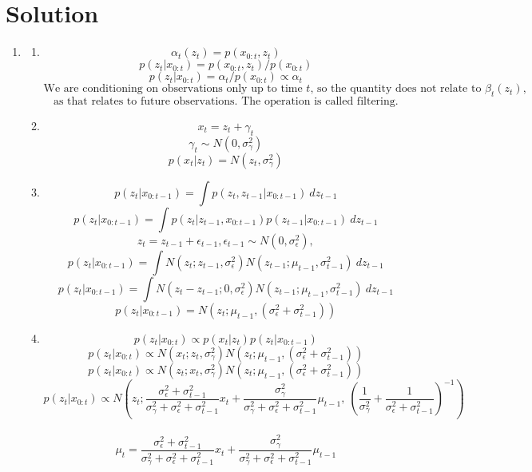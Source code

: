 \documentclass[submit]{../harvardml}
\newenvironment{solution}
  {\color{blue}\section*{Solution}}
{}
\begin{document}
\begin{solution}
	\begin{enumerate}
	    \item
            \begin{enumerate}
                \item 
                    $$\alpha_t(z_t) = p(x_{0:t}, z_t)$$
                    $$p(z_t|x_{0:t}) = p(x_{0:t}, z_t) / p(x_{0:t})$$
                    $$p(z_t|x_{0:t}) = \alpha_t / p(x_{0:t}) \propto \alpha_t$$
                    $$\text{We are conditioning on observations only up to time $t$, so the quantity does not relate to $\beta_t(z_t)$,}$$
                    $$\text{as that relates to future observations. The operation is called filtering.}$$
                \item
                    $$x_t = z_t + \gamma_t$$
                    $$\gamma_t \sim N(0, \sigma_{\gamma}^2)$$
                    $$p(x_t|z_t) = N(z_t, \sigma_{\gamma}^2)$$
                \item
                    $$p(z_t|x_{0:t-1}) = \int p(z_t, z_{t-1}|x_{0:t-1})\ dz_{t-1}$$
                    $$p(z_t|x_{0:t-1}) = \int p(z_t| z_{t-1},x_{0:t-1})p(z_{t-1}|x_{0:t-1})\ dz_{t-1}$$
                    $$z_t = z_{t-1} + \epsilon_{t-1}, \epsilon_{t-1} \sim N(0, \sigma_\epsilon^2),$$
                    $$p(z_t|x_{0:t-1}) = \int N(z_t; z_{t-1}, \sigma_\epsilon^2)N(z_{t-1}; \mu_{t-1}, \sigma_{t-1}^2)\ dz_{t-1}$$
                    $$p(z_t|x_{0:t-1}) = \int N(z_t -z_{t-1}; 0, \sigma_\epsilon^2)N(z_{t-1}; \mu_{t-1}, \sigma_{t-1}^2)\ dz_{t-1}$$
                    $$p(z_t|x_{0:t-1}) = N(z_t; \mu_{t-1}, (\sigma_\epsilon^2 + \sigma_{t-1}^2))$$
                \item
                    $$p(z_t|x_{0:t})\propto p(x_t|z_t)p(z_t|x_{0:t-1})$$
                    $$p(z_t|x_{0:t})\propto N(x_t;z_t, \sigma_{\gamma}^2)N(z_t; \mu_{t-1}, (\sigma_\epsilon^2 + \sigma_{t-1}^2))$$
                    $$p(z_t|x_{0:t})\propto N(z_t; x_t, \sigma_{\gamma}^2)N(z_t; \mu_{t-1}, (\sigma_\epsilon^2 + \sigma_{t-1}^2))$$
                    $$p(z_t|x_{0:t}) \propto N\left(z_t; \frac{\sigma_\epsilon^2 + \sigma_{t-1}^2}{\sigma_{\gamma}^2+\sigma_\epsilon^2 + \sigma_{t-1}^2}x_t + \frac{\sigma_{\gamma}^2}{\sigma_{\gamma}^2+\sigma_\epsilon^2 + \sigma_{t-1}^2}\mu_{t-1}, \ \left(\frac{1}{\sigma_{\gamma}^2} + \frac{1}{\sigma_\epsilon^2 + \sigma_{t-1}^2}\right)^{-1}\right)$$\\
                    $$\mu_t = \frac{\sigma_\epsilon^2 + \sigma_{t-1}^2}{\sigma_{\gamma}^2+\sigma_\epsilon^2 + \sigma_{t-1}^2}x_t + \frac{\sigma_{\gamma}^2}{\sigma_{\gamma}^2+\sigma_\epsilon^2 + \sigma_{t-1}^2}\mu_{t-1}$$

\end{enumerate}
\end{enumerate}
\end{solution}
\end{document}
